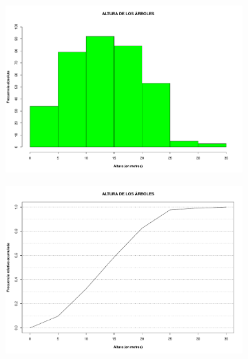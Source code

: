 \documentclass[11pt]{article}
\begin{document}
\begin{figure}[h!]
  \begin{center}
    \begin{subfigure}[b]{0.9\linewidth}
      \includegraphics[width=\linewidth]{histAltura.pdf}
      \caption{}
      \label{fig:histAltura}
    \end{subfigure}
  \end{center}
\end{figure}

\newpage

\begin{figure}[h!]
  \ContinuedFloat
  \begin{center}
    \begin{subfigure}[b]{0.9\linewidth}
      \includegraphics[width=\linewidth]{acumAltura.pdf}
      \caption{}
      \label{fig:acumAltura}
    \end{subfigure}
    \caption{}
  \end{center}
\end{figure}
\end{document}
